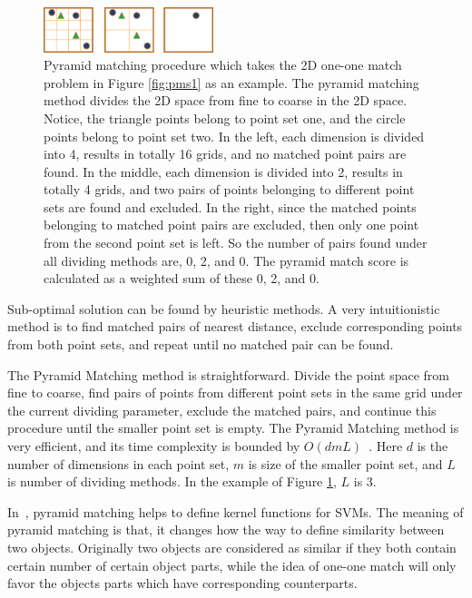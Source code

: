\documentclass[paper]{ieice}
\begin{document}
\begin{figure}
\centering
\includegraphics[width=0.44\textwidth]{pms2.eps}
\caption[Pyramid matching procedure]{Pyramid matching procedure which takes the 2D one-one match problem in Figure \ref{fig:pms1} as an example. The pyramid matching method divides the 2D space from fine to coarse in the 2D space. Notice, the triangle points belong to point set one, and the circle points belong to point set two. In the left, each dimension is divided into 4, results in totally 16 grids, and no matched point pairs are found. In the middle, each dimension is divided into 2, results in totally 4 grids, and two pairs of points belonging to different point sets are found and excluded. In the right, since the matched points belonging to matched point pairs are excluded, then only one point from the second point set is left. So the number of pairs found under all dividing methods are, 0, 2, and 0. The pyramid match score is calculated as a weighted sum of these 0, 2, and 0. }
\label{fig:p2}
\end{figure}




Sub-optimal solution can be found by heuristic methods. A very intuitionistic method is to find matched pairs of nearest distance, exclude corresponding points from both point sets, and repeat until no matched pair can be found.

The Pyramid Matching method is straightforward. Divide the point space from fine to coarse, find pairs of points from different point sets in the same grid under the current dividing parameter, exclude the matched pairs, and continue this procedure until the smaller point set is empty. The Pyramid Matching method is very efficient, and its time complexity is bounded by $O(dmL)$~\cite{pmk}. Here $d$ is the number of dimensions in each point set, $m$ is size of the smaller point set, and $L$ is number of dividing methods. In the example of Figure \ref{fig:p2}, $L$ is 3.

In~\cite{pmk}, pyramid matching helps to define kernel functions for SVMs. The meaning of pyramid matching is that, it changes how the way to define similarity between two objects. Originally two objects are considered as similar if they both contain certain number of certain object parts, while the idea of one-one match will only favor the objects parts which have corresponding counterparts.
\end{document}
